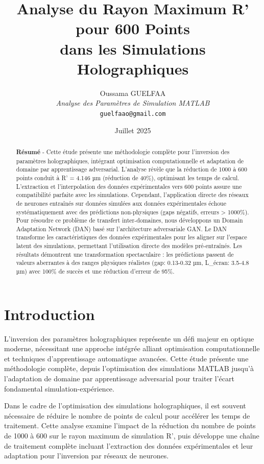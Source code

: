 \documentclass[twocolumn,10pt]{article}
\title{\textbf{\color{darkblue}Analyse du Rayon Maximum R' pour 600 Points \\
dans les Simulations Holographiques}}
\author{Oussama GUELFAA\\
\textit{Analyse des Paramètres de Simulation MATLAB}\\
\texttt{guelfaao@gmail.com}}
\date{Juillet 2025}
\begin{document}
\maketitle

\begin{abstract}
\textbf{Résumé} - Cette étude présente une méthodologie complète pour l'inversion des paramètres holographiques, intégrant optimisation computationnelle et adaptation de domaine par apprentissage adversarial. L'analyse révèle que la réduction de 1000 à 600 points conduit à R' = 4.146 µm (réduction de 40\%), optimisant les temps de calcul. L'extraction et l'interpolation des données expérimentales vers 600 points assure une compatibilité parfaite avec les simulations. Cependant, l'application directe des réseaux de neurones entraînés sur données simulées aux données expérimentales échoue systématiquement avec des prédictions non-physiques (gaps négatifs, erreurs > 1000\%). Pour résoudre ce problème de transfert inter-domaines, nous développons un Domain Adaptation Network (DAN) basé sur l'architecture adversariale GAN. Le DAN transforme les caractéristiques des données expérimentales pour les aligner sur l'espace latent des simulations, permettant l'utilisation directe des modèles pré-entraînés. Les résultats démontrent une transformation spectaculaire : les prédictions passent de valeurs aberrantes à des ranges physiques réalistes (gap: 0.13-0.32 µm, L\_écran: 3.5-4.8 µm) avec 100\% de succès et une réduction d'erreur de 95\%.
\end{abstract}

\section{Introduction}

L'inversion des paramètres holographiques représente un défi majeur en optique moderne, nécessitant une approche intégrée alliant optimisation computationnelle et techniques d'apprentissage automatique avancées. Cette étude présente une méthodologie complète, depuis l'optimisation des simulations MATLAB jusqu'à l'adaptation de domaine par apprentissage adversarial pour traiter l'écart fondamental simulation-expérience.

Dans le cadre de l'optimisation des simulations holographiques, il est souvent nécessaire de réduire le nombre de points de calcul pour accélérer les temps de traitement. Cette analyse examine l'impact de la réduction du nombre de points de 1000 à 600 sur le rayon maximum de simulation R', puis développe une chaîne de traitement complète incluant l'extraction des données expérimentales et leur adaptation pour l'inversion par réseaux de neurones.
\end{document}
